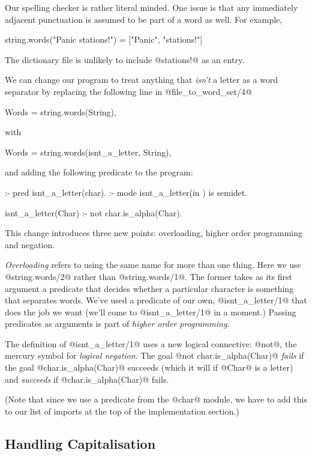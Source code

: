 Our spelling checker is rather literal minded.  One issue is that any
immediately adjacent punctuation is assumed to be part of a word as
well.  For example,
\begin{myverbatim}
    string.words("Panic stations!") = ["Panic", "stations!"]
\end{myverbatim}
The dictionary file is unlikely to include @stations!@ as an entry.

We can change our program to treat anything that \emph{isn't} a letter
as a word separator by replacing the following line in
@file_to_word_set/4@
\begin{myverbatim}
    Words = string.words(String),
\end{myverbatim}
with
\begin{myverbatim}
    Words = string.words(isnt_a_letter, String),
\end{myverbatim}
and adding the following predicate to the program:
\begin{myverbatim}
:- pred isnt_a_letter(char).
:- mode isnt_a_letter(in  ) is semidet.

isnt_a_letter(Char) :-
    not char.is_alpha(Char).
\end{myverbatim}
This change introduces three new points: overloading, higher order
programming and negation.

\emph{Overloading} refers to using the same name for more than one thing.
Here we use @string.words/2@ rather than @string.words/1@.  The former takes
as its first argument a predicate that decides whether a particular
character is something that separates words.  We've
used a predicate of our own, @isnt_a_letter/1@ that does the job we
want (we'll come to @isnt_a_letter/1@ in a moment.)  Passing predicates as
arguments is part of \emph{higher order programming}.

The definition of @isnt_a_letter/1@ uses a new logical connective: @not@,
the mercury symbol for \emph{logical negation}.  The goal
@not char.is_alpha(Char)@ \emph{fails} if the goal @char.is_alpha(Char)@
succeeds (which it will if @Char@ is a letter) and \emph{succeeds} if
@char.is_alpha(Char)@ fails.

(Note that since we use a predicate from the @char@ module, we have to add
this to our list of imports at the top of the implementation section.)

\subsection{Handling Capitalisation}

